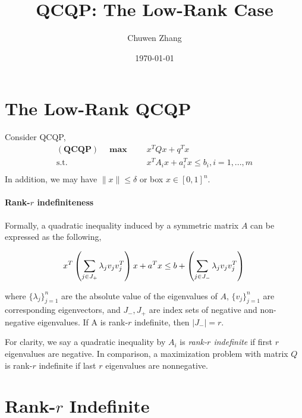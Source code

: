 \documentclass[a4paper, 10pt]{article}
\title{QCQP: The Low-Rank Case}
\author{Chuwen Zhang}
\date{\today}
\newcommand{\model}[1]{(\textbf{#1})}
\newcommand{\mx}{\mathbf{\max}\;}
\begin{document}
\maketitle
\section{The Low-Rank QCQP}

Consider QCQP,
\begin{equation}
    \label{eq:inhoqcqp}
    \begin{aligned}
        \model{QCQP} \quad \mx \quad & x^T Qx + q^T x                           \\
        \textrm{s.t.} \quad          & x^T A_i x + a_i^T x \le b_i, i=1, ..., m \\
    \end{aligned}
\end{equation}
In addition, we may have \(\|x\| \le \delta\) or box \(x \in [0, 1]^n\).

\paragraph{Rank-\(r\) indefiniteness}

Formally, a quadratic inequality induced by a symmetric matrix \(A\) can be expressed as the following,

\begin{equation}
    x^T \left(\sum_{j\in J_+} \lambda_j v_jv_j^T\right)x +a^Tx \le b + \left(\sum_{j\in J_-} \lambda_j v_jv_j^T\right) \\
\end{equation}

where \(\{\lambda_j\}_{j=1}^n\) are the absolute value of the eigenvalues of \(A\), \(\{v_j\}_{j=1}^n\) are corresponding eigenvectors, and \(J_-, J_+\) are index sets of negative and non-negative eigenvalues. If A is rank-\(r\) indefinite, then \(|J_-| = r\).

For clarity, we say a quadratic inequality by \(A_i\) is \emph{rank-\(r\) indefinite} if first \(r\) eigenvalues are negative. In comparison, a maximization problem with matrix \(Q\) is rank-\(r\) indefinite if last \(r\) eigenvalues are nonnegative.

\section{Rank-\(r\) Indefinite}
\end{document}
